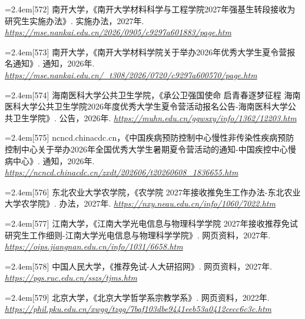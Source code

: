 {\par\noindent\hangindent=2.4em\label{src:S0276}{\color{cAccent}[572]} 南开大学，《南开大学材料科学与工程学院2027年强基生转段接收为研究生实施办法》. 实施办法，2027年. \textit{\url{https://mse.nankai.edu.cn/2026/0905/c9297a601883/page.htm}}\par
\par\noindent\hangindent=2.4em\label{src:S0277}{\color{cAccent}[573]} 南开大学，《南开大学材料学院关于举办2026年优秀大学生夏令营报名通知》. 通知，2026年. \textit{\url{https://mse.nankai.edu.cn/_t308/2026/0720/c9297a600570/page.htm}}\par
\par\noindent\hangindent=2.4em\label{src:S0280}{\color{cAccent}[574]} 海南医科大学公共卫生学院，《承公卫强国使命 启青春逐梦征程 海南医科大学公共卫生学院2026年度优秀大学生夏令营活动报名公告-海南医科大学公共卫生学院》. 公告，2026年. \textit{\url{https://muhn.edu.cn/ggwsxy/info/1362/12203.htm}}\par
\par\noindent\hangindent=2.4em\label{src:S0281}{\color{cAccent}[575]} ncncd.chinacdc.cn，《中国疾病预防控制中心慢性非传染性疾病预防控制中心关于举办2026年全国优秀大学生暑期夏令营活动的通知-中国疾控中心慢病中心》. 通知，2026年. \textit{\url{https://ncncd.chinacdc.cn/zxdt/202606/t20260608_1836655.htm}}\par
\par\noindent\hangindent=2.4em\label{src:S0283}{\color{cAccent}[576]} 东北农业大学农学院，《农学院 2027年接收推免生工作办法-东北农业大学农学院》. 办法，2027年. \textit{\url{https://nxy.neau.edu.cn/info/1060/7022.htm}}\par
\par\noindent\hangindent=2.4em\label{src:S0284}{\color{cAccent}[577]} 江南大学，《江南大学光电信息与物理科学学院 2027年接收推荐免试研究生工作细则-江南大学光电信息与物理科学学院》. 网页资料，2027年. \textit{\url{https://oips.jiangnan.edu.cn/info/1031/6658.htm}}\par
\par\noindent\hangindent=2.4em\label{src:S0288}{\color{cAccent}[578]} 中国人民大学，《推荐免试-人大研招网》. 网页资料，2027年. \textit{\url{https://pgs.ruc.edu.cn/sszs/tjms.htm}}\par
\par\noindent\hangindent=2.4em\label{src:S0289}{\color{cAccent}[579]} 北京大学，《北京大学哲学系宗教学系》. 网页资料，2022年. \textit{\url{https://phil.pku.edu.cn/xwgg/tzgg/7baf103dbe9441eeb53a0412cecc6c3c.htm}}\par
}
